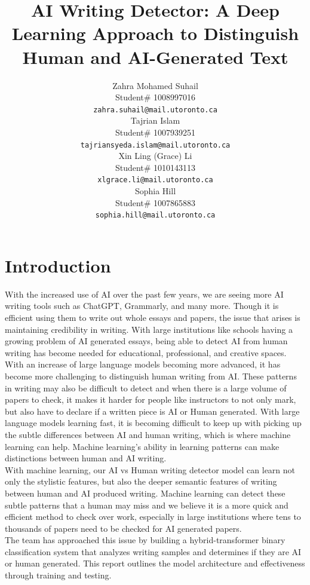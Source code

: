 \documentclass{article} %
\title{AI Writing Detector: A Deep Learning Approach to Distinguish Human and AI-Generated Text}
\author{Zahra Mohamed Suhail  \\
Student\# 1008997016 \\
\texttt{zahra.suhail@mail.utoronto.ca} \\
\And
Tajrian Islam \\
Student\# 1007939251 \\
\texttt{tajriansyeda.islam@mail.utoronto.ca} \\
\And
Xin Ling (Grace) Li  \\
Student\# 1010143113 \\
\texttt{xlgrace.li@mail.utoronto.ca} \\
\And
Sophia Hill  \\
Student\# 1007865883 \\
\texttt{sophia.hill@mail.utoronto.ca} \\
\And
}
\begin{document}
\maketitle
\newpage

\section{Introduction}
With the increased use of AI over the past few years, we are seeing more AI writing tools such as ChatGPT, Grammarly, and many more. Though it is efficient using them to write out whole essays and papers, the issue that arises is maintaining credibility in writing. With large institutions like schools having a growing problem of AI generated essays, being able to detect AI from human writing has become needed for educational, professional, and creative spaces. \\
With an increase of large language models becoming more advanced, it has become more challenging to distinguish human writing from AI. These patterns in writing may also be difficult to detect and when there is a large volume of papers to check, it makes it harder for people like instructors to not only mark, but also have to declare if a written piece is AI or Human generated. With large language models learning fast, it is becoming difficult to keep up with picking up the subtle differences between AI and human writing, which is where machine learning can help. Machine learning’s ability in learning patterns can make distinctions between human and AI writing.\\
With machine learning, our AI vs Human writing detector model can learn not only the stylistic features, but also the deeper semantic features of writing between human and AI produced writing. Machine learning can detect these subtle patterns that a human may miss and we believe it is a more quick and efficient method to check over work, especially in large institutions where tens to thousands of papers need to be checked for AI generated papers. \\
The team has approached this issue by building a hybrid-transformer binary classification system that analyzes writing samples and determines if they are AI or human generated. This report outlines the model architecture and effectiveness through training and testing.
\end{document}
